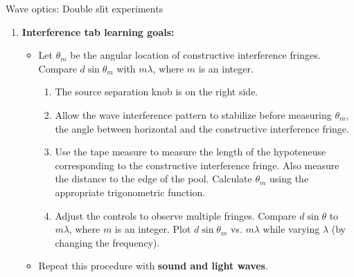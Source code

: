 \documentclass{beamer}
\begin{document}
\begin{frame}{Wave optics: Double slit experiments}
\footnotesize
\begin{enumerate}
\item \textbf{Interference tab learning goals:}
\begin{itemize}
\footnotesize
\item Let $\theta_m$ be the angular location of constructive interference fringes.  Compare $d\sin\theta_m$ with $m\lambda$, where $m$ is an integer.
\begin{enumerate}
\item The source separation knob is on the right side.
\item Allow the wave interference pattern to stabilize before measuring $\theta_m$, the angle between horizontal and the constructive interference fringe.
\item Use the tape measure to measure the length of the hypoteneuse corresponding to the constructive interference fringe.  Also measure the distance to the edge of the pool.  Calculate $\theta_m$ using the appropriate trigonometric function.
\item Adjust the controls to observe multiple fringes.  Compare $d\sin\theta$ to $m \lambda$, where $m$ is an integer.  Plot $d\sin\theta_m$ vs. $m\lambda$ while varying $\lambda$ (by changing the frequency).
\end{enumerate}
\item Repeat this procedure with \textbf{\alert{sound and light waves}}.
\end{itemize}
\end{enumerate}
\end{frame}
\end{document}
